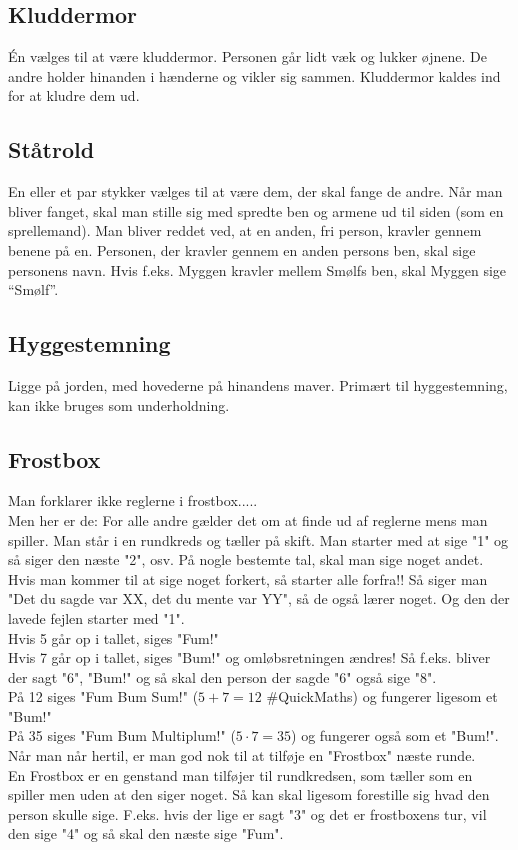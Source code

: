 \documentclass[../../main.tex]{subfiles}
\begin{document}
\begin{multicols}{2}
\subsection*{Kluddermor}
    Én vælges til at være kluddermor. Personen går lidt væk og lukker øjnene. De andre holder hinanden i hænderne og vikler sig sammen. Kluddermor kaldes ind for at kludre dem ud.

\subsection*{Ståtrold}
    En eller et par stykker vælges til at være dem, der skal fange de andre. Når man bliver fanget, skal man stille sig med spredte ben og armene ud til siden (som en sprellemand). Man bliver reddet ved, at en anden, fri person, kravler gennem benene på en. Personen, der kravler gennem en anden persons ben, skal sige personens navn. Hvis f.eks. Myggen kravler mellem Smølfs ben, skal Myggen sige “Smølf”.

\subsection*{Hyggestemning}
    Ligge på jorden, med hovederne på hinandens maver. Primært til hyggestemning, kan ikke bruges som underholdning.

\subsection*{Frostbox}
    Man forklarer ikke reglerne i frostbox.....\\
    Men her er de: For alle andre gælder det om at finde ud af reglerne mens man spiller. Man står i en rundkreds og tæller på skift. Man starter med at sige "1" og så siger den næste "2", osv. På nogle bestemte tal, skal man sige noget andet. Hvis man kommer til at sige noget forkert, så starter alle forfra!! Så siger man "Det du sagde var XX, det du mente var YY", så de også lærer noget. Og den der lavede fejlen starter med "1".  \\
    Hvis 5 går op i tallet, siges "Fum!"\\
    Hvis 7 går op i tallet, siges "Bum!" og omløbsretningen ændres! Så f.eks. bliver der sagt "6", "Bum!" og så skal den person der sagde "6" også sige "8". \\
    På 12 siges "Fum Bum Sum!" ($5+7=12$ \#QuickMaths) og fungerer ligesom et "Bum!"\\
    På 35 siges "Fum Bum Multiplum!" ($5\cdot7=35$) og fungerer også som et "Bum!". Når man når hertil, er man god nok til at tilføje en "Frostbox" næste runde. \\
    En Frostbox er en genstand man tilføjer til rundkredsen, som tæller som en spiller men uden at den siger noget. Så kan skal ligesom forestille sig hvad den person skulle sige. F.eks. hvis der lige er sagt "3" og det er frostboxens tur, vil den sige "4" og så skal den næste sige "Fum". 



\end{multicols}
\end{document}
